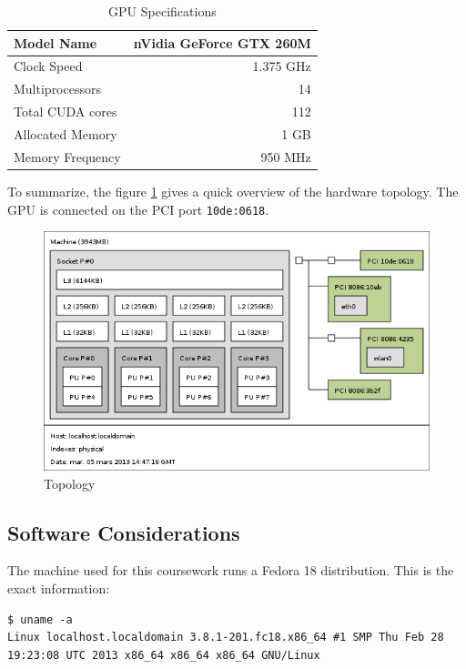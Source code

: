 \documentclass[fleqn,11pt]{SelfArx} %
\begin{document}
\begin{table}[h]
	\centering

	\begin{tabular}{|l|r|}
		\hline
		Model Name & nVidia GeForce GTX 260M \\
		\hline
		Clock Speed & 1.375 GHz \\
		\hline
		Multiprocessors & 14 \\
		\hline
		Total CUDA cores & 112 \\
		\hline
		Allocated Memory & 1 GB \\
		\hline
		Memory Frequency & 950 MHz \\
		\hline
	\end{tabular}

	\caption{GPU Specifications}
	\label{GPUspecs}
\end{table}

To summarize, the figure \ref{topo} gives a quick overview of the hardware topology. The GPU is connected on the PCI port \verb+10de:0618+.

\begin{figure}[h]
	\centering

	\includegraphics[width=.48\textwidth]{topo.png}

	\caption{Topology}
	\label{topo}
\end{figure}

\subsection{Software Considerations}

The machine used for this coursework runs a Fedora 18 distribution. This is the exact information:

\begin{lstlisting}
$ uname -a
Linux localhost.localdomain 3.8.1-201.fc18.x86_64 #1 SMP Thu Feb 28 19:23:08 UTC 2013 x86_64 x86_64 x86_64 GNU/Linux
\end{lstlisting}


\end{document}
